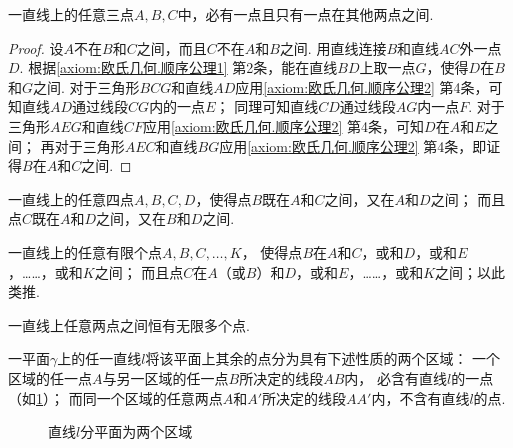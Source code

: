 \begin{theorem}\label{theorem:欧氏几何.定理4}
一直线上的任意三点\(A,B,C\)中，必有一点且只有一点在其他两点之间.
\begin{proof}
设\(A\)不在\(B\)和\(C\)之间，而且\(C\)不在\(A\)和\(B\)之间.
用直线连接\(B\)和直线\(AC\)外一点\(D\).
根据\cref{axiom:欧氏几何.顺序公理1} 第2条，能在直线\(BD\)上取一点\(G\)，使得\(D\)在\(B\)和\(G\)之间.
对于三角形\(BCG\)和直线\(AD\)应用\cref{axiom:欧氏几何.顺序公理2} 第4条，可知直线\(AD\)通过线段\(CG\)内的一点\(E\)；
同理可知直线\(CD\)通过线段\(AG\)内一点\(F\).
对于三角形\(AEG\)和直线\(CF\)应用\cref{axiom:欧氏几何.顺序公理2} 第4条，可知\(D\)在\(A\)和\(E\)之间；
再对于三角形\(AEC\)和直线\(BG\)应用\cref{axiom:欧氏几何.顺序公理2} 第4条，即证得\(B\)在\(A\)和\(C\)之间.
\end{proof}
\end{theorem}

\begin{theorem}\label{theorem:欧氏几何.定理5}
一直线上的任意四点\(A,B,C,D\)，使得点\(B\)既在\(A\)和\(C\)之间，又在\(A\)和\(D\)之间；
而且点\(C\)既在\(A\)和\(D\)之间，又在\(B\)和\(D\)之间.
\end{theorem}

\begin{corollary}\label{theorem:欧氏几何.定理6}
一直线上的任意有限个点\(A,B,C,\dotsc,K\)，
使得点\(B\)在\(A\)和\(C\)，或和\(D\)，或和\(E\)，……，或和\(K\)之间；
而且点\(C\)在\(A\)（或\(B\)）和\(D\)，或和\(E\)，……，或和\(K\)之间；以此类推.
\end{corollary}

\begin{corollary}\label{theorem:欧氏几何.定理7}
一直线上任意两点之间恒有无限多个点.
\end{corollary}

\begin{theorem}\label{theorem:欧氏几何.定理8}
一平面\(\gamma\)上的任一直线\(l\)将该平面上其余的点分为具有下述性质的两个区域：
一个区域的任一点\(A\)与另一区域的任一点\(B\)所决定的线段\(AB\)内，
必含有直线\(l\)的一点（如\cref{figure:欧氏几何.直线l分平面为两个区域}）；
而同一个区域的任意两点\(A\)和\(A'\)所决定的线段\(AA'\)内，不含有直线\(l\)的点.
\begin{figure}[ht]
\centering
{}
\caption{直线\(l\)分平面为两个区域}
\label{figure:欧氏几何.直线l分平面为两个区域}
\end{figure}
\end{theorem}

